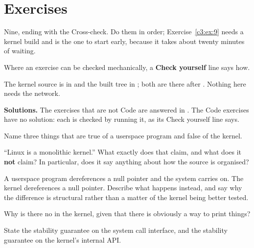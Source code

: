 
\section{Exercises}
\label{c3:sec:exercises}\label{c3:app:c}

\begin{aside}
Nine, ending with the Cross-check. Do them in order; Exercise~\ref{c3:ex:9} needs a kernel build and
is the one to start early, because it takes about twenty minutes of waiting.

Where an exercise can be checked mechanically, a \textbf{Check yourself} line says how.

The kernel source is in  and the built tree in ; both
are there after . Nothing here needs the network.

\textbf{Solutions.} The exercises that are not Code are answered in . The Code
exercises have no solution: each is checked by running it, as its Check yourself line says.
\end{aside}

\label{c3:ex:1}

 Name three things that are true of a userspace program and false of the kernel.

 ``Linux is a monolithic kernel.'' What exactly does that claim, and what does it
\textbf{not} claim? In particular, does it say anything about how the source is organised?

 A userspace program dereferences a null pointer and the system carries on. The kernel
dereferences a null pointer. Describe what happens instead, and say why the difference is structural
rather than a matter of the kernel being better tested.

 Why is there no  in the kernel, given that there is obviously a way to print
things?

\label{c3:ex:2}

 State the stability guarantee on the system call interface, and the stability guarantee on
the kernel's internal API.

